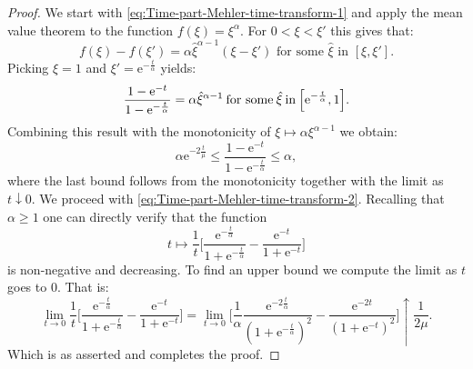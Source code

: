 \documentclass[a4paper,oneside,10pt]{amsproc}
\theoremstyle{remark}
\renewcommand{\leq}{\leqslant}
\renewcommand{\leq}{\leqslant}
\renewcommand{\geq}{\geqslant}
\newcommand{\e}{\mathrm{e}} %
\renewcommand{\leq}{\leqslant}%
\renewcommand{\geq}{\geqslant}%
\begin{document}
\begin{proof}
  We start with \eqref{eq:Time-part-Mehler-time-transform-1} and apply
  the mean value theorem to the function $f(\xi) = \xi^\alpha$. For $0
  < \xi < \xi'$ this gives that:
  \begin{equation*}
    f(\xi) - f(\xi') = \alpha \hat{\xi}^{\alpha - 1} (\xi - \xi')
    \text{ for some $\hat \xi$ in $[\xi, \xi']$}.
  \end{equation*}
  Picking $\xi = 1$ and $\xi' = \e^{-\frac{t}{\alpha}}$ yields:
  \begin{equation}
    \label{eq:Time-part-Mehler-time-transform-proof-1}
    \frac{1 - \e^{-t}}{1 - \e^{-\frac{t}{\alpha}}} = \alpha
    \hat{\xi}^{\alpha - 1} \:\text{for some}\: \hat{\xi} \:\text{in}\:
    \Bigl[\e^{-\frac{t}{\alpha}}, 1 \Bigr].
  \end{equation}
  Combining this result with the monotonicity of $\xi \mapsto
  \alpha \xi^{\alpha - 1}$ we obtain:
  \begin{equation*}
    \alpha \e^{-2\frac{t}{\mu}} \leq \frac{1 - \e^{-t}}{1 -
      \e^{-\frac{t}{\alpha}}} \leq \alpha,
  \end{equation*}
  where the last bound follows from the monotonicity together with the
  limit as $t \downarrow 0$.
  We proceed with \eqref{eq:Time-part-Mehler-time-transform-2}.
  Recalling that $\alpha \geq 1$ one can directly verify that the
  function
  \begin{equation*}
    t \mapsto \frac1t \biggl[\frac{\e^{-\frac{t}{\alpha}}}{1 +
      \e^{-\frac{t}{\alpha}}} - \frac{\e^{-t}}{1 + \e^{-t}} \biggr]
  \end{equation*}
  is non-negative and decreasing. To find an upper bound we compute the limit
  as $t$ goes to $0$. That is: 
   \begin{equation*}
    \lim_{t \to 0} \frac1t \biggl[\frac{\e^{-\frac{t}\alpha}}{1 +
      \e^{-\frac{t}{\alpha}}} - \frac{\e^{-t}}{1 + \e^{-t}} \biggr] 
    = \lim_{t \to 0} \biggl[\frac1\alpha \frac{\e^{-2\frac{t}{\alpha}}}{(1 +
      \e^{-\frac{t}{\alpha}})^2} - \frac{\e^{-2t}}{(1 + \e^{-t})^2} \biggr] \uparrow \frac{1}{2\mu}.
  \end{equation*}
  Which is as asserted and completes the proof.
\end{proof}
\end{document}
